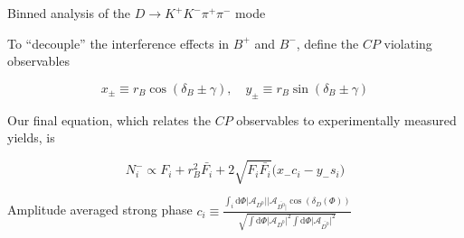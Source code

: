 \documentclass{beamer}
\begin{document}
\begin{frame}{Binned analysis of the $D\to K^+K^-\pi^+\pi^-$ mode}
  \begin{center}
    \Large To ``decouple'' the interference effects in $B^+$ and $B^-$, define the $C\!P$ violating observables
  \end{center}
  \vspace{-0.1cm}
  \begin{equation*}
    x_\pm\equiv r_B\cos(\delta_B\pm\gamma), \quad y_\pm\equiv r_B\sin(\delta_B\pm\gamma)
  \end{equation*}
  \begin{center}
    \Large Our final equation, which relates the $C\!P$ observables to experimentally measured yields, is
  \end{center}
  \begin{equation*}
    N_i^-\propto F_i + r_B^2\bar{F_i} + 2\sqrt{F_i\bar{F_i}}\big(x_-c_i - y_-s_i\big)
  \end{equation*}
  \vspace{-0.7cm}
  \begin{center}
    \begin{minipage}{6cm}
      \begin{block}{\centering Amplitude averaged strong phase}
        \centering
        $c_i\equiv\frac{\int_i\mathrm{d}\Phi\lvert\mathcal{A}_{D^0}\lvert\lvert\mathcal{A}_{\bar{D^0}\lvert}\cos(\delta_D(\Phi))}{\sqrt{\int\mathrm{d}\Phi\lvert\mathcal{A}_{D^0}\lvert^2\int\mathrm{d}\Phi\lvert\mathcal{A}_{\bar{D^0}}\lvert^2}}$
      \end{block}
    \end{minipage}
  \end{center}
\end{frame}
\end{document}
